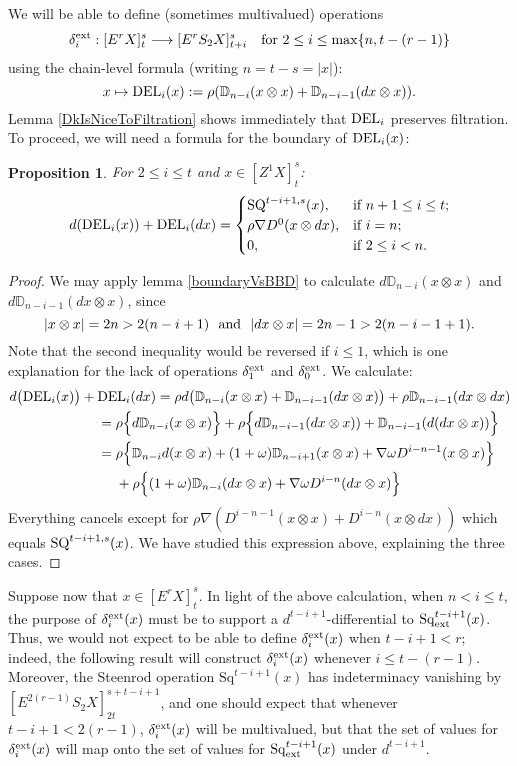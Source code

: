\documentclass[11pt]{amsart}
\theoremstyle{plain}
\newtheorem{prop}[thm]{Proposition}
\theoremstyle{definition}
\renewcommand{\to}{\longrightarrow}
\theoremstyle{plain}
\newcommand{\twist}{\omega}
\newcommand{\Nabla}{\nabla}
\newcommand{\Sq}{\mathrm{Sq}}
\newcommand{\E}[5]{[E^{#1}_{#2}#3]^{#4}_{#5}}
\newcommand{\EZ}[5]{[Z^{#1}_{#2}#3]^{#4}_{#5}}
\begin{document}
\begin{second quadrant homotopy}
We will be able to define (sometimes multivalued) operations
\[\delta^\textup{ext}_i:\E{r}{}{X}{s}{t}\to \E{r}{}{S_2X}{s}{t+i}\textup{\ \ \ for $2\leq i\leq\max\{n,t-(r-1)\}$}\]
using the chain-level formula (writing $n=t-s=|x|$):
\[x\mapsto \textup{DEL}_{i}(x):=\rho(\mathbb{D}_{n-i}(x\otimes x)+\mathbb{D}_{n-i-1}(dx\otimes x)).\]
Lemma \ref{DkIsNiceToFiltration} shows immediately that $\textup{DEL}_i$ preserves filtration.
To proceed, we will need a formula for the boundary of $\textup{DEL}_i(x)$:
\begin{prop}
\label{dvsDEL}
For $2\leq i\leq t$ and $x\in \EZ{1}{}{X}{s}{t}$:
\[d(\textup{DEL}_i(x))+ \textup{DEL}_i(dx)=\begin{cases}
\textup{SQ}^{t-i+1,s}(x),&\textup{if }n+1\leq i \leq t;\\
\rho\Nabla D^0(x\otimes dx),&\textup{if }i=n;\\
0,&\textup{if }2\leq i< n.
\end{cases}\]
\end{prop}
\begin{proof}
We may apply lemma \ref{boundaryVsBBD} to calculate $d\mathbb{D}_{n-i}(x\otimes x)$ and $d\mathbb{D}_{n-i-1}(dx\otimes x)$, since 
\[|x\otimes x|=2n> 2(n-i+1)\textup{ \ and \ }|dx\otimes x|=2n-1> 2(n-i-1+1).\]
Note that the second inequality would be reversed if $i\leq1$, which is one explanation for the lack of operations $\delta^\textup{ext}_1$ and $\delta^\textup{ext}_0$. We calculate:
\begin{alignat*}{2}
d\bigl(\textup{DEL}_i(x)\bigr)+{}& \textup{DEL}_i(dx)
=
\rho d\bigl(\mathbb{D}_{n-i}(x\otimes x)+\mathbb{D}_{n-i-1}(dx\otimes x)\bigr)+\rho\mathbb{D}_{n-i-1}(dx\otimes dx)%
\\
&=
\rho\Bigl\{d\mathbb{D}_{n-i}(x\otimes x)\Bigr\}+\rho\Bigl\{d\mathbb{D}_{n-i-1}(dx\otimes x))+\mathbb{D}_{n-i-1}(d(dx\otimes x))\Bigr\}%
\\
&=
\rho\Bigl\{\mathbb{D}_{n-i}d(x\otimes x)+(1+\twist)\mathbb{D}_{n-i+1}(x\otimes x)+\Nabla\twist D^{i-n-1}(x\otimes x)\Bigr\}
\\
&\ \ \ \ +\rho\Bigl\{(1+\twist)\mathbb{D}_{n-i}(dx\otimes x)+\Nabla\twist D^{i-n}(dx\otimes x)\Bigr\}
\end{alignat*}
Everything cancels except for $\rho\Nabla(D^{i-n-1}(x\otimes x)+D^{i-n}(x\otimes dx))$ which equals $\textup{SQ}^{t-i+1,s}(x)$. We have studied this expression above, explaining the three cases.
\end{proof}
Suppose now that $x\in \E{r}{}{X}{s}{t}$. In light of the above calculation, when $n<i\leq t$, the purpose of $\delta^\textup{ext}_i(x)$ must be to support a $d^{t-i+1}$-differential to $\Sq_\textup{ext}^{t-i+1}(x)$. Thus, we would not expect to be able to define $\delta^\textup{ext}_i(x)$ when $t-i+1<r$; indeed, the following result will construct $\delta^\textup{ext}_i(x)$ whenever $i\leq t-(r-1)$. Moreover, the Steenrod operation $\Sq^{t-i+1}(x)$ has indeterminacy vanishing by $\E{2(r-1)}{}{S_2X}{s+t-i+1}{2t}$, and one should expect that whenever $t-i+1<2(r-1)$, $\delta^\textup{ext}_i(x)$ will be multivalued, but that the set of values for $\delta^\textup{ext}_i(x)$ will map onto the set of values for $\Sq_\textup{ext}^{t-i+1}(x)$ under $d^{t-i+1}$. 

\end{second quadrant homotopy}
\end{document}
